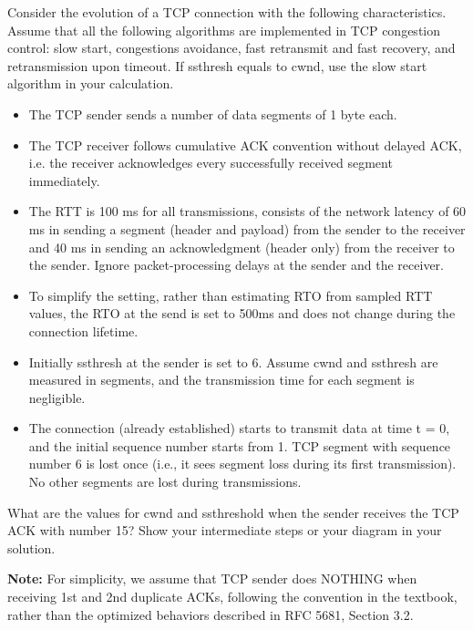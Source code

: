 \documentclass{report}
\begin{document}
\newpage
\begin{problem}
Consider the evolution of a TCP connection with the following characteristics. Assume that all the following algorithms are implemented in TCP congestion control: slow start, congestions avoidance, fast retransmit and fast recovery, and retransmission upon timeout. If ssthresh equals to cwnd, use the slow start algorithm in your calculation.


\begin{itemize}
\item The TCP sender sends a number of data segments of 1 byte each. 
\item The TCP receiver follows cumulative ACK convention without delayed ACK, i.e. the receiver acknowledges every successfully received segment immediately.
\item The RTT is 100 ms for all transmissions, consists of the network latency of 60 ms in sending a segment (header and payload) from the sender to the receiver and 40 ms in sending an acknowledgment (header only) from the receiver to the sender. Ignore packet-processing delays at the sender and the receiver.
\item To simplify the setting, rather than estimating RTO from sampled RTT values, the RTO at the send is set to 500ms and does not change during the connection lifetime.
\item Initially ssthresh at the sender is set to 6. Assume cwnd and ssthresh are measured in segments, and the transmission time for each segment is negligible.
\item The connection (already established) starts to transmit data at time t = 0, and the initial sequence number starts from 1. TCP segment with sequence number 6 is lost once (i.e., it sees segment loss during its first transmission). No other segments are lost during transmissions.
\end{itemize}
What are the values for cwnd and ssthreshold when the sender receives the TCP ACK with number 15? Show your intermediate steps or your diagram in your solution.

\textbf{Note:} For simplicity, we assume that TCP sender does NOTHING when receiving 1st and 2nd duplicate ACKs, following the convention in the textbook, rather than the optimized behaviors described in RFC 5681, Section 3.2.

\begin{answer}{65em}
  \hfil
\end{answer}
\end{problem}
\end{document}
